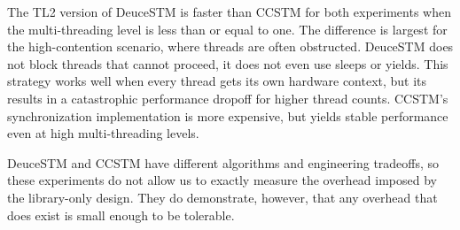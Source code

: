 The TL2 version of DeuceSTM is faster than CCSTM for both experiments when
the multi-threading level is less than or equal to one.  The difference
is largest for the high-contention scenario, where threads are often
obstructed.  DeuceSTM does not block threads that cannot proceed, it
does not even use sleeps or yields.  This strategy works well when every
thread gets its own hardware context, but its results in a catastrophic
performance dropoff for higher thread counts.  CCSTM's synchronization
implementation is more expensive, but yields stable performance even at
high multi-threading levels.

DeuceSTM and CCSTM have different algorithms and engineering tradeoffs,
so these experiments do not allow us to exactly measure the overhead
imposed by the library-only design.  They do demonstrate, however,
that any overhead that does exist is small enough to be tolerable.
